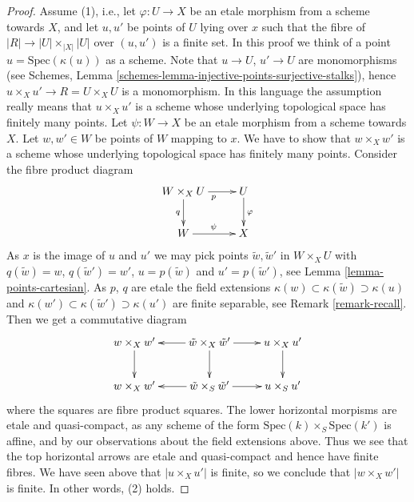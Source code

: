 \begin{proof}
Assume (1), i.e., let $\varphi : U \to X$ be an etale morphism from a scheme
towards $X$, and let $u, u'$ be points of $U$ lying over $x$
such that the fibre of $|R| \to |U| \times_{|X|} |U|$ over $(u, u')$
is a finite set. In this proof we think of a point $u = \text{Spec}(\kappa(u))$
as a scheme. Note that $u \to U$, $u' \to U$ are monomorphisms (see
Schemes, Lemma \ref{schemes-lemma-injective-points-surjective-stalks}),
hence $u \times_X u' \to R = U \times_X U$ is a monomorphism.
In this language the assumption really means that
$u \times_X u'$ is a scheme whose underlying topological space has
finitely many points.
Let $\psi : W \to X$ be an etale morphism from a scheme towards $X$.
Let $w, w' \in W$ be points of $W$ mapping to $x$.
We have to show that $w \times_X w'$ is a scheme whose underlying topological
space has finitely many points.
Consider the fibre product diagram
$$
\xymatrix{
W \times_X U \ar[r]_p \ar[d]_q & U \ar[d]^\varphi \\
W \ar[r]^\psi & X
}
$$
As $x$ is the image of $u$ and $u'$ we may pick points
$\tilde w, \tilde w'$ in $W \times_X U$ with $q(\tilde w) = w$,
$q(\tilde w') = w'$, $u = p(\tilde w)$ and $u' = p(\tilde w')$, see
Lemma \ref{lemma-points-cartesian}. As $p$, $q$ are etale the field extensions
$\kappa(w) \subset \kappa(\tilde w) \supset \kappa(u)$ and
$\kappa(w') \subset \kappa(\tilde w') \supset \kappa(u')$ are
finite separable, see Remark \ref{remark-recall}.
Then we get a commutative diagram
$$
\xymatrix{
w \times_X w' \ar[d] &
\tilde w \times_X \tilde w' \ar[l] \ar[d] \ar[r] &
u \times_X u' \ar[d] \\
w \times_X w' &
\tilde w \times_S \tilde w' \ar[l] \ar[r] &
u \times_S u'
}
$$
where the squares are fibre product squares. The lower horizontal
morpisms are etale and quasi-compact, as any scheme of the form
$\text{Spec}(k) \times_S \text{Spec}(k')$ is affine, and by our
observations about the field extensions above.
Thus we see that the top horizontal arrows are etale and quasi-compact
and hence have finite fibres.
We have seen above that $|u \times_X u'|$ is finite, so we conclude that
$|w \times_X w'|$ is finite. In other words, (2) holds.


\end{proof}
